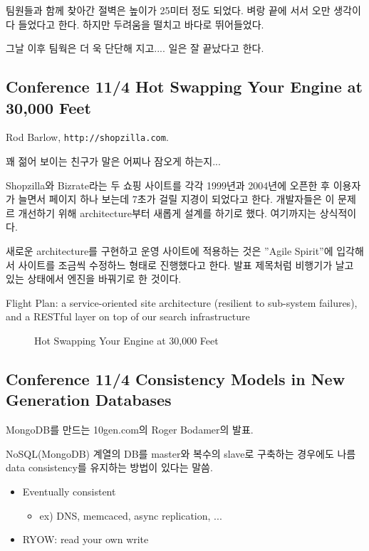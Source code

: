 \documentclass[a4paper]{article}
\begin{document}
팀원들과 함께 찾아간 절벽은 높이가 25미터 정도 되었다. 벼랑 끝에 서서
오만 생각이 다 들었다고 한다. 하지만 두려움을 떨치고 바다로
뛰어들었다.
 
그날 이후 팀웍은 더 욱 단단해 지고.... 일은 잘 끝났다고 한다.
 
\subsection{Conference 11/4 Hot Swapping Your Engine at 30,000 Feet}
 
Rod Barlow, \texttt{http://shopzilla.com}.
 
꽤 젊어 보이는 친구가 말은 어찌나 잠오게 하는지...
 
Shopzilla와 Bizrate라는 두 쇼핑 사이트를 각각 1999년과 2004년에 오픈한
후 이용자가 늘면서 페이지 하나 보는데 7초가 걸릴 지경이 되었다고 한다.
개발자들은 이 문제르 개선하기 위해 architecture부터 새롭게 설계를 하기로 했다.
여기까지는 상식적이다.

새로운 architecture를 구현하고 운영 사이트에 적용하는 것은 ''Agile Spirit''에
입각해서 사이트를 조금씩 수정하느 형태로 진행했다고 한다. 발표 제목처럼
비행기가 날고 있는 상태에서 엔진을 바꿔기로 한 것이다.
 
Flight Plan: a service-oriented site architecture (resilient to
sub-system failures), and a RESTful layer on top of our search
infrastructure

\begin{figure}[t]
    \begin{Frame}
        \begin{center}
        \end{center}
    \end{Frame}
    \caption{Hot Swapping Your Engine at 30,000 Feet}
    \label{swapping engine}
\end{figure}
 
\subsection{Conference 11/4 Consistency Models in New Generation Databases}
 
MongoDB를 만드는 10gen.com의 Roger Bodamer의 발표.
 
NoSQL(MongoDB) 계열의 DB를 master와 복수의 slave로 구축하는 경우에도
나름 data consistency를 유지하는 방법이 있다는 말씀.
 
\begin{itemize}
\item Eventually consistent
    \begin{itemize}
    \item ex) DNS, memcaced, async replication, ...
    \end{itemize}
\item RYOW: read your own write
\end{itemize}
 
\end{document}
